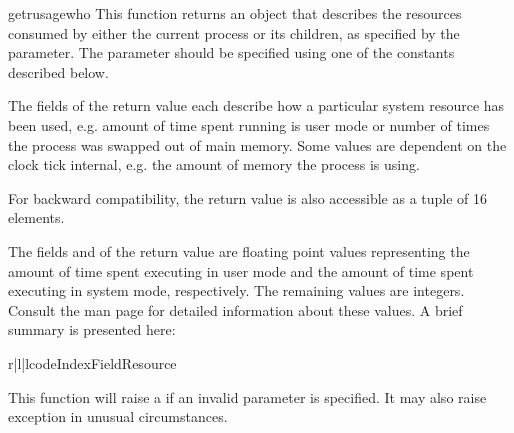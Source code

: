 \begin{funcdesc}{getrusage}{who}
  This function returns an object that describes the resources
  consumed by either the current process or its children, as specified
  by the  parameter.  The  parameter should be
  specified using one of the  constants described
  below.

  The fields of the return value each describe how a particular system
  resource has been used, e.g. amount of time spent running is user mode
  or number of times the process was swapped out of main memory. Some
  values are dependent on the clock tick internal, e.g. the amount of
  memory the process is using.

  For backward compatibility, the return value is also accessible as
  a tuple of 16 elements.

  The fields  and  of the return value
  are floating point values representing the amount of time spent
  executing in user mode and the amount of time spent executing in system
  mode, respectively. The remaining values are integers. Consult the
   man page for detailed information about these
  values. A brief summary is presented here:

\begin{tableiii}{r|l|l}{code}{Index}{Field}{Resource}
\end{tableiii}

  This function will raise a  if an invalid
   parameter is specified. It may also raise
   exception in unusual circumstances.

\end{funcdesc}

